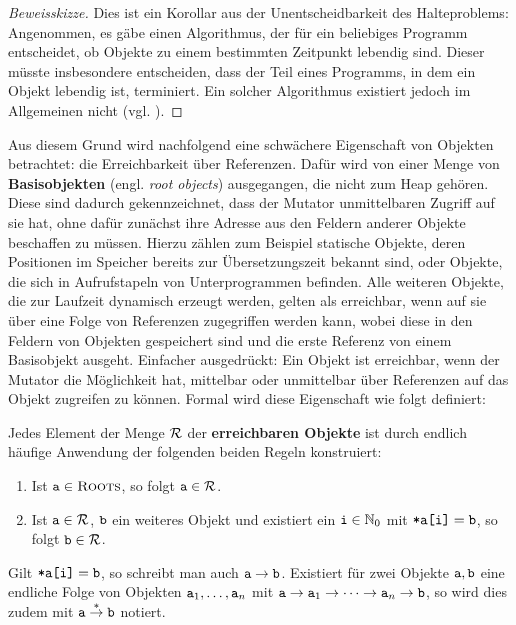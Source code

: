 \begin{proof}[Beweisskizze]
	Dies ist ein Korollar aus der Unentscheidbarkeit des Halteproblems:
	Angenommen, es gäbe einen Algorithmus, der für ein beliebiges Programm entscheidet, ob Objekte zu einem bestimmten Zeitpunkt lebendig sind.
	Dieser müsste insbesondere entscheiden, dass der Teil eines Programms, in dem ein Objekt lebendig ist, terminiert.
	Ein solcher Algorithmus existiert jedoch im Allgemeinen nicht (vgl. \cite[Kap. 4.2]{sipser}).
\end{proof}

Aus diesem Grund wird nachfolgend eine schwächere Eigenschaft von Objekten betrachtet: die Erreichbarkeit über Referenzen.
Dafür wird von einer Menge \Roots von \textbf{Basisobjekten} (engl. \textit{root objects}) ausgegangen, die nicht zum Heap gehören.
Diese sind dadurch gekennzeichnet, dass der Mutator unmittelbaren Zugriff auf sie hat, ohne dafür zunächst ihre Adresse aus den Feldern anderer Objekte beschaffen zu müssen.
Hierzu zählen zum Beispiel statische Objekte, deren Positionen im Speicher bereits zur Übersetzungszeit bekannt sind, oder Objekte, die sich in Aufrufstapeln von Unterprogrammen befinden.
Alle weiteren Objekte, die zur Laufzeit dynamisch erzeugt werden, gelten als erreichbar, wenn auf sie über eine Folge von Referenzen zugegriffen werden kann, wobei diese in den Feldern von Objekten gespeichert sind und die erste Referenz von einem Basisobjekt ausgeht.
Einfacher ausgedrückt: Ein Objekt ist erreichbar, wenn der Mutator die Möglichkeit hat, mittelbar oder unmittelbar über Referenzen auf das Objekt zugreifen zu können.
Formal wird diese Eigenschaft wie folgt definiert:

\begin{mybox}
\begin{defn}[Erreichbarkeit]
	\label{def:erreichbar}
	Jedes Element der Menge $\mathcal{R}$ der \textbf{erreichbaren Objekte} ist durch endlich häufige Anwendung der folgenden beiden Regeln konstruiert:
	\begin{enumerate}[(1)]
		\item Ist $\texttt{a} \in \textsc{Roots}$, so folgt $\texttt{a} \in \mathcal{R}$.
		\item Ist $\texttt{a} \in \mathcal{R}$, $\texttt{b}$ ein weiteres Objekt und existiert ein $\texttt{i} \in \mathbb{N}_0$ mit $\texttt{*a[i]} = \texttt{b}$, so folgt $\texttt{b} \in \mathcal{R}$.
	\end{enumerate}
	Gilt $\texttt{*a[i]} = \texttt{b}$, so schreibt man auch $\texttt{a} \rightarrow \texttt{b}$.
	Existiert für zwei Objekte $\texttt{a}, \texttt{b}$ eine endliche Folge von Objekten $\texttt{a}_1, \dots, \texttt{a}_n$ mit $\texttt{a} \rightarrow \texttt{a}_1 \rightarrow \dots \rightarrow \texttt{a}_n \rightarrow \texttt{b}$, so wird dies zudem mit $\texttt{a} \overset{*}{\rightarrow} \texttt{b}$ notiert.
\end{defn}
\end{mybox}

